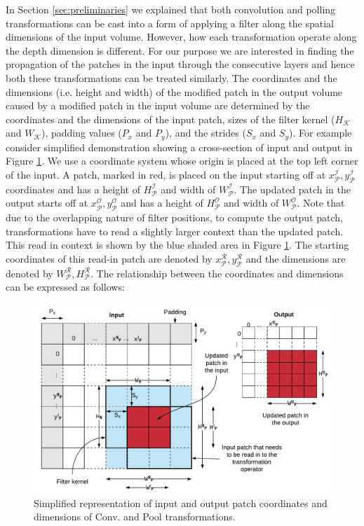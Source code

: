 In Section \ref{sec:preliminaries} we explained that both convolution and polling transformations can be cast into a form of applying a filter along the spatial dimensions of the input volume.
However, how each transformation operate along the depth dimension is different.
For our purpose we are interested in finding the propagation of the patches in the input through the consecutive layers and hence both these transformations can be treated similarly.
The coordinates and the dimensions (i.e. height and width) of the modified patch in the output volume caused by a modified patch in the input volume are determined by the coordinates and the dimensions of the input patch, sizes of the filter kernel ($H_\mathcal{K}$ and $W_\mathcal{K}$), padding values ($P_x$ and $P_y$), and the strides ($S_x$ and $S_y$).
For example consider simplified demonstration showing a cross-section of input and output in Figure \ref{fig:dimensions}.
We use a coordinate system whose origin is placed at the top left corner of the input.
A patch, marked in red, is placed on the input starting off at $x^\mathcal{I}_\mathcal{P}, y^\mathcal{I}_\mathcal{P}$ coordinates and has a height of $H^\mathcal{I}_\mathcal{P}$ and width of $W^\mathcal{I}_\mathcal{P}$.
The updated patch in the output starts off at $x^\mathcal{O}_\mathcal{P}, y^\mathcal{O}_\mathcal{P}$ and has a height of $H^\mathcal{O}_\mathcal{P}$ and width of $W^\mathcal{O}_\mathcal{P}$.
Note that due to the overlapping nature of filter positions, to compute the output patch, transformations have to read a slightly larger context than the updated patch. This read in context is shown by the blue shaded area in Figure \ref{fig:dimensions}.
The starting coordinates of this read-in patch are denoted by $x^\mathcal{R}_\mathcal{P}, y^\mathcal{R}_\mathcal{P}$ and the dimensions are denoted by $W^\mathcal{R}_\mathcal{P}, H^\mathcal{R}_\mathcal{P}$.
The relationship between the coordinates and dimensions can be expressed as follows:

\begin{figure}[t]
\includegraphics[width=\columnwidth]{images/dimensions}
\caption{Simplified representation of input and output patch coordinates and dimensions of Conv. and Pool transformations.}
\label{fig:dimensions}
\end{figure}

